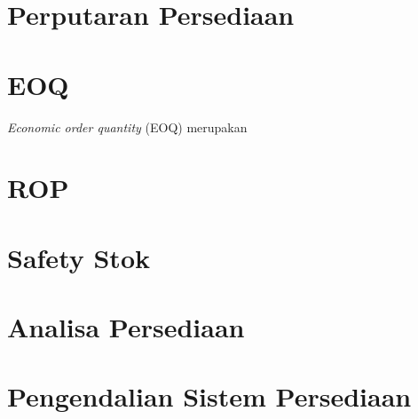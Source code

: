\section{Perputaran Persediaan}
\section{EOQ}

\textit{Economic order quantity} (EOQ) merupakan 

\section{ROP}
\section{Safety Stok}
\section{Analisa Persediaan}
\section{Pengendalian Sistem Persediaan}

